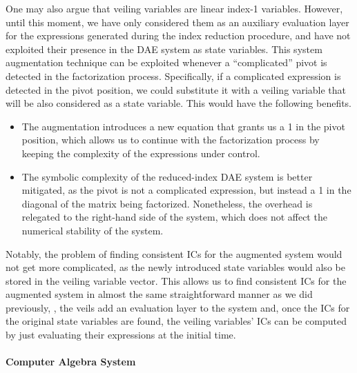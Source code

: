 One may also argue that veiling variables are linear index-1 variables. However, until this moment, we have only considered them as an auxiliary evaluation layer for the expressions generated during the index reduction procedure, and have not exploited their presence in the \ac{DAE} system as state variables. This system augmentation technique can be exploited whenever a ``complicated'' pivot is detected in the factorization process. Specifically, if a complicated expression is detected in the pivot position, we could substitute it with a veiling variable that will be also considered as a state variable. This would have the following benefits.
%
\begin{itemize}
  \setlength{\itemsep}{0.0em}
  \item The augmentation introduces a new equation that grants us a 1 in the pivot position, which allows us to continue with the factorization process by keeping the complexity of the expressions under control.
  \item The symbolic complexity of the reduced-index \ac{DAE} system is better mitigated, as the pivot is not a complicated expression, but instead a 1 in the diagonal of the matrix being factorized. Nonetheless, the overhead is relegated to the right-hand side of the system, which does not affect the numerical stability of the system.
\end{itemize}

Notably, the problem of finding consistent \acp{IC} for the augmented system would not get more complicated, as the newly introduced state variables would also be stored in the veiling variable vector. This allows us to find consistent \acp{IC} for the augmented system in almost the same straightforward manner as we did previously, \ie{}, the veils add an evaluation layer to the system and, once the \acp{IC} for the original state variables are found, the veiling variables' \acp{IC} can be computed by just evaluating their expressions at the initial time.

\paragraph{Computer Algebra System}

